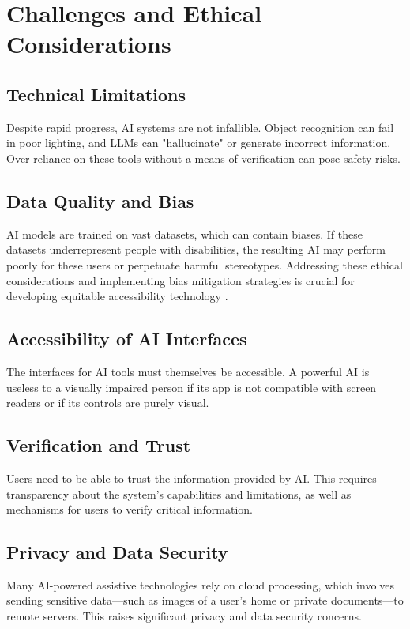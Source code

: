 \section{Challenges and Ethical Considerations}\label{ch9:sec:challenges}

\subsection{Technical Limitations}\label{ch9:ssec:technical-limitations}
Despite rapid progress, AI systems are not infallible. Object recognition can fail in poor lighting, and LLMs can "hallucinate" or generate incorrect information. Over-reliance on these tools without a means of verification can pose safety risks.

\subsection{Data Quality and Bias}\label{ch9:ssec:data-bias}
AI models are trained on vast datasets, which can contain biases. If these datasets underrepresent people with disabilities, the resulting AI may perform poorly for these users or perpetuate harmful stereotypes. Addressing these ethical considerations and implementing bias mitigation strategies is crucial for developing equitable accessibility technology \supercite{AI_Ethics_Bias}.

\subsection{Accessibility of AI Interfaces}\label{ch9:ssec:ai-interfaces}
The interfaces for AI tools must themselves be accessible. A powerful AI is useless to a visually impaired person if its app is not compatible with screen readers or if its controls are purely visual.

\subsection{Verification and Trust}\label{ch9:ssec:verification-trust}
Users need to be able to trust the information provided by AI. This requires transparency about the system's capabilities and limitations, as well as mechanisms for users to verify critical information.

\subsection{Privacy and Data Security}\label{ch9:ssec:privacy}
Many AI-powered assistive technologies rely on cloud processing, which involves sending sensitive data—such as images of a user's home or private documents—to remote servers. This raises significant privacy and data security concerns.

